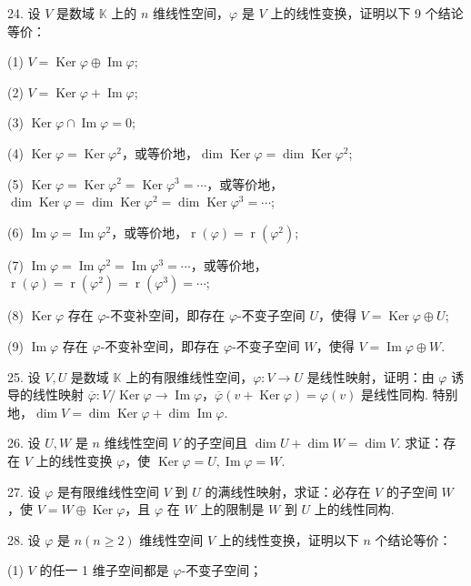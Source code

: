 \documentclass[UTF8,12pt,a4paper,fontset=fandol]{ctexart}
\begin{document}
24. 设 $V$ 是数域 $\mathbb{K}$ 上的 $n$ 维线性空间，$\varphi$ 是 $V$ 上的线性变换，证明以下 9 个结论等价：

(1) $V=\operatorname{Ker}\varphi\oplus\operatorname{Im}\varphi$;

(2) $V=\operatorname{Ker}\varphi+\operatorname{Im}\varphi$;

(3) $\operatorname{Ker}\varphi\cap\operatorname{Im}\varphi=0$;

(4) $\operatorname{Ker}\varphi=\operatorname{Ker}\varphi^2$，或等价地，$\dim\operatorname{Ker}\varphi=\dim\operatorname{Ker}\varphi^2$;

(5) $\operatorname{Ker}\varphi=\operatorname{Ker}\varphi^2=\operatorname{Ker}\varphi^3=\cdots$，或等价地，$\dim\operatorname{Ker}\varphi=\dim\operatorname{Ker}\varphi^2=\dim\operatorname{Ker}\varphi^3=\cdots$;

(6) $\operatorname{Im}\varphi=\operatorname{Im}\varphi^2$，或等价地，$\operatorname{r}(\varphi)=\operatorname{r}(\varphi^2)$;

(7) $\operatorname{Im}\varphi=\operatorname{Im}\varphi^2=\operatorname{Im}\varphi^3=\cdots$，或等价地，$\operatorname{r}(\varphi)=\operatorname{r}(\varphi^2)=\operatorname{r}(\varphi^3)=\cdots$;

(8) $\operatorname{Ker}\varphi$ 存在 $\varphi$-不变补空间，即存在 $\varphi$-不变子空间 $U$，使得 $V=\operatorname{Ker}\varphi\oplus U$;

(9) $\operatorname{Im}\varphi$ 存在 $\varphi$-不变补空间，即存在 $\varphi$-不变子空间 $W$，使得 $V=\operatorname{Im}\varphi\oplus W$.

25. 设 $V,U$ 是数域 $\mathbb{K}$ 上的有限维线性空间，$\varphi:V\to U$ 是线性映射，证明：由 $\varphi$ 诱导的线性映射 $\overline{\varphi}:V/\operatorname{Ker}\varphi\to\operatorname{Im}\varphi$，$\overline{\varphi}(v+\operatorname{Ker}\varphi)=\varphi(v)$ 是线性同构. 特别地，$\dim V=\dim\operatorname{Ker}\varphi+\dim\operatorname{Im}\varphi$.

26. 设 $U,W$ 是 $n$ 维线性空间 $V$ 的子空间且 $\dim U+\dim W=\dim V$. 求证：存在 $V$ 上的线性变换 $\varphi$，使 $\operatorname{Ker}\varphi=U,\operatorname{Im}\varphi=W$.

27. 设 $\varphi$ 是有限维线性空间 $V$ 到 $U$ 的满线性映射，求证：必存在 $V$ 的子空间 $W$，使 $V=W\oplus\operatorname{Ker}\varphi$，且 $\varphi$ 在 $W$ 上的限制是 $W$ 到 $U$ 上的线性同构.

28. 设 $\varphi$ 是 $n(n\geq 2)$ 维线性空间 $V$ 上的线性变换，证明以下 $n$ 个结论等价：

(1) $V$ 的任一 1 维子空间都是 $\varphi$-不变子空间；
\end{document}

